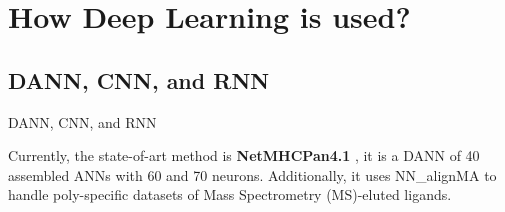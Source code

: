 \documentclass[10pt]{beamer}
\newcommand{\1}{
	\setbeamertemplate{background}{
		\texttt{[image: img/1]}
		\tikz[overlay] \fill[fill opacity=0.75,fill=white] (0,0) rectangle (-\paperwidth,\paperheight);
	}
}
\begin{document}
\section{How Deep Learning is used?}


\subsection{DANN, CNN, and RNN }


\begin{frame}{DANN, CNN, and RNN }{}
		
	\begin{block}{}
		Currently, the state-of-art method is \textbf{NetMHCPan4.1} \cite{reynisson2020netmhcpan}, it is a DANN of 40 assembled ANNs with 60 and 70 neurons. Additionally, it uses NN\_alignMA \cite{alvarez2019nnalign_ma} to handle poly-specific datasets of Mass Spectrometry (MS)-eluted ligands. 
	\end{block}	
	
\end{frame}
\end{document}
